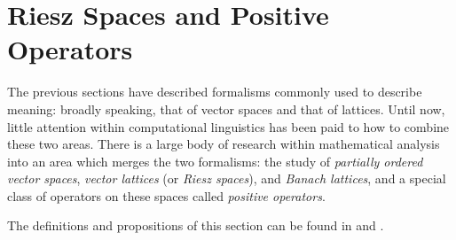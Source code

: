 



\section{Riesz Spaces and Positive Operators}
 \label{vector-lattices}
 
The previous sections have described formalisms commonly used to describe meaning: broadly speaking, that of vector spaces and that of lattices. Until now, little attention within computational linguistics has been paid to how to combine these two areas. There is a large body of research within mathematical analysis into an area which merges the two formalisms: the study of \emph{partially ordered vector spaces}, \emph{vector lattices} (or \emph{Riesz spaces}), and \emph{Banach lattices}, and a special class of operators on these spaces called \emph{positive operators}.


The definitions and propositions of this section can be found in \cite{Abramovich:02} and \cite{Aliprantis:85}.

